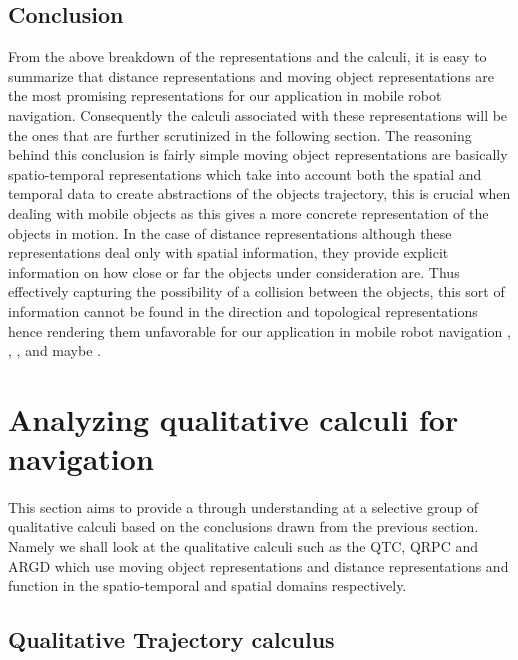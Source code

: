 		\subsection{Conclusion}From the above breakdown of the representations and the calculi, it is easy to summarize that distance representations and moving object representations are the most promising representations for our application in mobile robot navigation. Consequently the calculi associated with these representations will be the ones that are further scrutinized in the following section. The reasoning behind this conclusion is fairly simple moving object representations are basically spatio-temporal representations which take into account both the spatial and temporal data to create abstractions of the objects trajectory, this is crucial when dealing with mobile objects as this gives a more concrete representation of the objects in motion. In the case of distance representations although these representations deal only with spatial information, they provide explicit information on how close or far the objects under consideration are. Thus effectively capturing the possibility of a collision between the objects, this sort of information cannot be found in the direction and topological representations hence rendering them unfavorable for our application in mobile robot navigation \cite{chen2015survey}, \cite{cohn1997qualitative}, \cite{cohn2001qualitative}, \cite{cohn2008qualitative} and maybe \cite{Yan2012QualitativeRA}.
	
	\section{Analyzing qualitative calculi for navigation}
	\paragraph{} This section aims to provide a through understanding at a selective group of qualitative calculi based on the conclusions drawn from the previous section. Namely we shall look at the qualitative calculi such as the QTC, QRPC and ARGD which use moving object representations and distance representations and function in the spatio-temporal and spatial domains respectively.
	\subsection{Qualitative Trajectory calculus}
